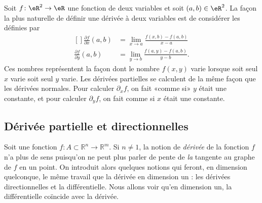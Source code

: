 Soit \( f\colon \eR^2\to \eR\) une fonction de deux variables et soit \( (a,b)\in\eR^2\). La façon la plus naturelle de définir une dérivée à deux variables est de considérer les  définies par
\begin{equation}
	\begin{aligned}[]
		\frac{ \partial f }{ \partial x }(a,b) & =\lim_{x\to a} \frac{ f(x,b)-f(a,b) }{ x-a } \\
		\frac{ \partial f }{ \partial y }(a,b) & =\lim_{y\to b} \frac{ f(a,y)-f(a,b) }{y-b}.
	\end{aligned}
\end{equation}
Ces nombres représentent la façon dont le nombre \( f(x,y)\) varie lorsque soit seul \( x\) varie soit seul \( y\) varie. Les dérivées partielles se calculent de la même façon que les dérivées normales. Pour calculer \( \partial_xf\), on fait «comme si» \( y\) était une constante, et pour calculer \( \partial_yf\), on fait comme si \( x\) était une constante.

\subsection{Dérivée partielle et directionnelles}

Soit une fonction \( f:A\subset \mathbb{R}^n \rightarrow \mathbb{R}^m\). Si \( n\neq 1\), la notion de \emph{dérivée} de la fonction \( f\) n'a plus de sens puisqu'on ne peut plus parler de pente de \emph{la} tangente au graphe de \( f\) en un point. On introduit alors quelques notions qui feront, en dimension quelconque, le même travail que la dérivée en dimension un : les dérivées directionnelles et la différentielle. Nous allons voir qu'en dimension un, la différentielle coïncide avec la dérivée.

